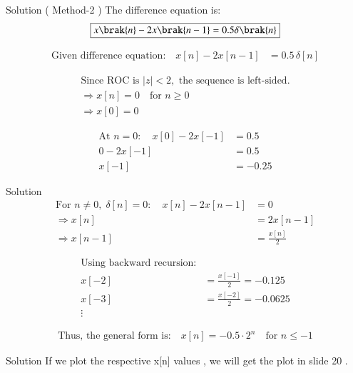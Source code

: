 \documentclass{beamer}
\begin{document}
\begin{frame}{Solution ( Method-2 )}
    The difference equation is:
\begin{align}
    \boxed{x\brak{n} - 2x\brak{n-1} = 0.5\delta\brak{n}}
\end{align}

\begin{align}
\text{Given difference equation:} \quad 
x[n] - 2x[n-1] &= 0.5\,\delta[n]
\end{align}

\begin{align}
\text{Since ROC is } |z| < 2, \text{ the sequence is left-sided.} \\
\Rightarrow x[n] = 0 \quad \text{for } n \ge 0 \\
\Rightarrow x[0] = 0
\end{align}

\begin{align}
\text{At } n = 0: \quad 
x[0] - 2x[-1] &= 0.5 \\
0 - 2x[-1] &= 0.5 \\
x[-1] &= -0.25
\end{align}


\end{frame}

\begin{frame}{Solution}
    \begin{align}
\text{For } n \neq 0, \; \delta[n] = 0: \quad 
x[n] - 2x[n-1] &= 0 \\
\Rightarrow x[n] &= 2x[n-1] \\
\Rightarrow x[n-1] &= \frac{x[n]}{2}
\end{align}

\begin{align}
\text{Using backward recursion:} \\
x[-2] &= \frac{x[-1]}{2} = -0.125 \\
x[-3] &= \frac{x[-2]}{2} = -0.0625 \\
\vdots
\end{align}

\begin{align}
\text{Thus, the general form is:} \quad 
x[n] = -0.5 \cdot 2^n \quad \text{for } n \le -1
\end{align}
\end{frame}

\begin{frame}{Solution}
    If we plot the respective x[n] values , we will get the plot in slide 20 .
\end{frame}
\end{document}
